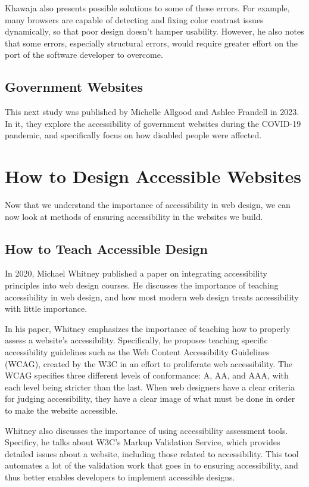 \documentclass{article}
\begin{document}
Khawaja also presents possible solutions to some of these errors.
For example, many browsers are capable of detecting and fixing color contrast issues dynamically, so that poor design doesn't hamper usability.
However, he also notes that some errors, especially structural errors, would require greater effort on the port of the software developer to overcome.

\subsection{Government Websites}
This next study was published by Michelle Allgood and Ashlee Frandell in 2023.
In it, they explore the accessibility of government websites during the COVID-19 pandemic, and specifically focus on how disabled people were affected.
\cite{GovCovid}


\section{How to Design Accessible Websites}
Now that we understand the importance of accessibility in web design, we can now look at methods of ensuring accessibility in the websites we build.

\subsection{How to Teach Accessible Design}
In 2020, Michael Whitney published a paper on integrating accessibility principles into web design courses.
He discusses the importance of teaching accessibility in web design, and how most modern web design treats accessibility with little importance.
\cite{Learning}

In his paper, Whitney emphasizes the importance of teaching how to properly assess a website's accessibility.
Specifically, he proposes teaching specific accessibility guidelines such as the Web Content Accessibility Guidelines (WCAG), created by the W3C in an effort to proliferate web accessibility.
The WCAG specifies three different levels of conformance: A, AA, and AAA, with each level being stricter than the last.
When web designers have a clear criteria for judging accessibility, they have a clear image of what must be done in order to make the website accessible.

Whitney also discusses the importance of using accessibility assessment tools.
Specificy, he talks about W3C's Markup Validation Service, which provides detailed issues about a website, including those related to accessibility.
This tool automates a lot of the validation work that goes in to ensuring accessibility, and thus better enables developers to implement accessible designs.
\end{document}
